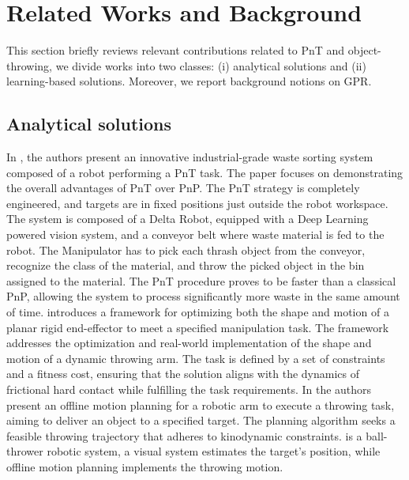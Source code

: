 \section{Related Works and Background}
\label{sec:related_work}
This section briefly reviews relevant contributions related to PnT and object-throwing, we divide works into two classes: (i) analytical solutions and (ii) learning-based solutions. Moreover, we report background notions on GPR.

\subsection{Analytical solutions}
In \cite{urban_waste_throwing}, the authors present an innovative industrial-grade waste sorting system composed of a robot performing a PnT task. The paper focuses on demonstrating the overall advantages of PnT over PnP. The PnT strategy is completely engineered, and targets are in fixed positions just outside the robot workspace. The system is composed of a Delta Robot, equipped with a Deep Learning powered vision system, and a conveyor belt where waste material is fed to the robot. The Manipulator has to pick each thrash object from the conveyor, recognize the class of the material, and throw the picked object in the bin assigned to the material. The PnT procedure proves to be faster than a classical PnP, allowing the system to process significantly more waste in the same amount of time.
\cite{taylor2019optimal_motion_planning} introduces a framework for optimizing both the shape and motion of a planar rigid end-effector to meet a specified manipulation task. The framework addresses the optimization and real-world implementation of the shape and motion of a dynamic throwing arm. The task is defined by a set of constraints and a fitness cost, ensuring that the solution aligns with the dynamics of frictional hard contact while fulfilling the task requirements.
In \cite{stochastic_motion_planning_obj_throwing} the authors present an offline motion planning for a robotic arm to execute a throwing task, aiming to deliver an object to a specified target. The planning algorithm seeks a feasible throwing trajectory that adheres to kinodynamic constraints.
\cite{ball_throwing_visual_feedbacK_gripper} is a ball-thrower robotic system, a visual system estimates the target's position, while offline motion planning implements the throwing motion.

